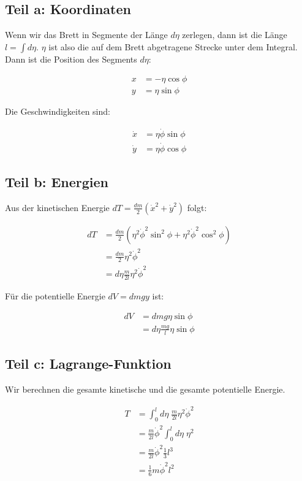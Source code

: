 \documentclass[a4paper,german,12pt,smallheadings]{scrartcl}
\begin{document}
\subsection*{Teil a: Koordinaten}

Wenn wir das Brett in Segmente der Länge $d \eta$ zerlegen, dann ist die Länge
$l = \int d \eta$. $\eta$ ist also die auf dem Brett abgetragene Strecke unter
dem Integral. Dann ist die Position des Segments $d \eta$:

\begin{align*}
  x &= - \eta \cos \phi \\
  y &= \eta \sin \phi
\end{align*}

Die Geschwindigkeiten sind:

\begin{align*}
  \dot{x} &= \eta \dot{\phi} \sin \phi \\
  \dot{y} &= \eta \dot{\phi} \cos \phi
\end{align*}


\subsection*{Teil b: Energien}

Aus der kinetischen Energie $dT = \frac{dm}{2}(\dot{x}^2 + \dot{y}^2)$ folgt:

\begin{align*}
  dT &= \frac{dm}{2}(\eta^2 \dot{\phi}^2 \sin^2 \phi + \eta^2 \dot{\phi}^2 \cos^2 \phi) \\
     &= \frac{dm}{2} \eta^2 \dot{\phi}^2 \\
     &= d \eta \frac{m}{2l} \eta^2 \dot{\phi}^2
\end{align*}

Für die potentielle Energie $dV = dm g y$ ist:

\begin{align*}
  dV &= dm g \eta \sin \phi \\
     &= d \eta \frac{mg}{l} \eta \sin \phi
\end{align*}

\subsection*{Teil c: Lagrange-Funktion}

Wir berechnen die gesamte kinetische und die gesamte potentielle Energie.

\begin{align*}
  T &= \int_0^l d \eta\; \frac{m}{2l} \eta^2 \dot{\phi}^2 \\
    &= \frac{m}{2l} \dot{\phi}^2 \int_0^l d\eta \; \eta^2 \\
    &= \frac{m}{2l} \dot{\phi}^2 \frac{1}{3} l^3 \\
    &= \frac{1}{6} m \dot{\phi}^2 l^2
\end{align*}
\end{document}
